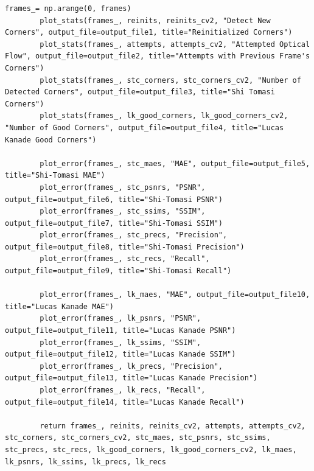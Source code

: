 \documentclass[11pt, conference, letterpaper]{IEEEtran}
\begin{document}
\begin{lstlisting}[style=python, caption={\texttt{utils.py}}, label={lst:utils}]
        frames_= np.arange(0, frames)
        plot_stats(frames_, reinits, reinits_cv2, "Detect New Corners", output_file=output_file1, title="Reinitialized Corners")
        plot_stats(frames_, attempts, attempts_cv2, "Attempted Optical Flow", output_file=output_file2, title="Attempts with Previous Frame's Corners")
        plot_stats(frames_, stc_corners, stc_corners_cv2, "Number of Detected Corners", output_file=output_file3, title="Shi Tomasi Corners")
        plot_stats(frames_, lk_good_corners, lk_good_corners_cv2, "Number of Good Corners", output_file=output_file4, title="Lucas Kanade Good Corners")
        
        plot_error(frames_, stc_maes, "MAE", output_file=output_file5, title="Shi-Tomasi MAE")
        plot_error(frames_, stc_psnrs, "PSNR", output_file=output_file6, title="Shi-Tomasi PSNR")
        plot_error(frames_, stc_ssims, "SSIM", output_file=output_file7, title="Shi-Tomasi SSIM")
        plot_error(frames_, stc_precs, "Precision", output_file=output_file8, title="Shi-Tomasi Precision")
        plot_error(frames_, stc_recs, "Recall", output_file=output_file9, title="Shi-Tomasi Recall")
        
        plot_error(frames_, lk_maes, "MAE", output_file=output_file10, title="Lucas Kanade MAE")
        plot_error(frames_, lk_psnrs, "PSNR", output_file=output_file11, title="Lucas Kanade PSNR")
        plot_error(frames_, lk_ssims, "SSIM", output_file=output_file12, title="Lucas Kanade SSIM")
        plot_error(frames_, lk_precs, "Precision", output_file=output_file13, title="Lucas Kanade Precision")
        plot_error(frames_, lk_recs, "Recall", output_file=output_file14, title="Lucas Kanade Recall")
    
        return frames_, reinits, reinits_cv2, attempts, attempts_cv2, stc_corners, stc_corners_cv2, stc_maes, stc_psnrs, stc_ssims, stc_precs, stc_recs, lk_good_corners, lk_good_corners_cv2, lk_maes, lk_psnrs, lk_ssims, lk_precs, lk_recs
    
\end{lstlisting}
\end{document}
